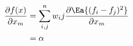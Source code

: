 \begin{align*}
\frac{\partial f(x)}{\partial x_m} 
& = \sum_{i,j}^{n} w_ij {\frac{\partial{}\Ea{(f_i-f_j)^2}}{\partial{} x_m}} \\
& = \alpha
\end{align*}
